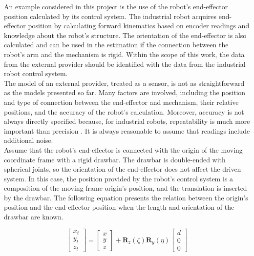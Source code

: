 An example considered in this project is the use of the robot's end-effector position calculated by its control system. The industrial robot acquires end-effector position by calculating forward kinematics based on encoder readings and knowledge about the robot's structure. The orientation of the end-effector is also calculated and can be used in the estimation if the connection between the robot's arm and the mechanism is rigid. Within the scope of this work, the data from the external provider should be identified with the data from the industrial robot control system.\\

The model of an external provider, treated as a sensor, is not as straightforward as the models presented so far. Many factors are involved, including the position and type of connection between the end-effector and mechanism, their relative positions, and the accuracy of the robot’s calculation. Moreover, accuracy is not always directly specified because, for industrial robots, repeatability is much more important than precision \cite{shiakolas2002accuracy}. It is always reasonable to assume that readings include additional noise.\\

Assume that the robot's end-effector is connected with the origin of the moving coordinate frame with a rigid drawbar. The drawbar is double-ended with spherical joints, so the orientation of the end-effector does not affect the driven system. In this case, the position provided by the robot's control system is a composition of the moving frame origin's position, and the translation is inserted by the drawbar. The following equation presents the relation between the origin's position and the end-effector position when the length and orientation of the drawbar are known.

\begin{equation}
	\begin{bmatrix}
		x_t \\ y_t \\ z_t 
	\end{bmatrix}
	=
	\begin{bmatrix}
		x \\ y \\ z 
	\end{bmatrix}
	+
	\bm{R}_z \left( \zeta \right)
	\bm{R}_y \left( \eta \right)
	\begin{bmatrix}
		d \\ 0 \\ 0 
	\end{bmatrix}
	\label{drawbar_model}
\end{equation}

